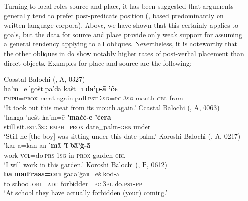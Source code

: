 \documentclass[output=paper,colorlinks,citecolor=brown,draftmode]{langscibook}
\begin{document}
Turning to local roles source and place, it has been suggested that  arguments generally tend to prefer post-predicate position (\citealt{jing_word_2021}, based predominantly on written-language corpora). Above, we have shown that this certainly applies to goals, but the data for source and place provide only weak support for assuming a general tendency applying to all obliques. Nevertheless, it is noteworthy that the other obliques in  do show notably higher rates of post-verbal placement than direct objects. Examples for place and source are the following:

\ea\label{Balochi:ex:21}
\ea\label{Balochi:ex:21a}
Coastal Balochi (\citealt{nourzaei_balochi_coastal_2021}, A, 0327) \\
\gll ha'm=ē 'gōšt pa'dā kašt=ī \textbf{da'p-ā} \textbf{'če} \\
\textsc{emph}=\textsc{prox} meat again pull.\textsc{pst}.\textsc{3sg}=\textsc{pc}.\textsc{3sg} mouth-\textsc{obl} from \\
\glt `{I}t took out this meat from its mouth again.' 
\ex\label{Balochi:ex:21b}
Coastal Balochi (\citealt{nourzaei_balochi_coastal_2021}, A, 0063)\\
\gll 'hanga 'nešt ha'm=ē \textbf{'mačč-e} \textbf{'čērā} \\
still sit.\textsc{pst}.\textsc{3sg} \textsc{emph}=\textsc{prox} date\_palm-\textsc{gen} under \\
\glt `{S}till he [the boy] was sitting under this date-palm.'
\ex\label{Balochi:ex:21c}
Koroshi Balochi (\citealt{nourzaei_balochi_koroshi_2021}, A, 0217)\\
\gll 'kār a=kan-ān \textbf{'mā} \textbf{'ī} \textbf{bā'ġ-ā} \\
work \textsc{vcl}=do.\textsc{prs}-\textsc{1sg} in \textsc{prox} garden-\textsc{obl} \\
\glt `I will work in this garden.'
\ex\label{Balochi:ex:21d}
Koroshi Balochi (\citealt{nourzaei_balochi_koroshi_2021}, B, 0612)\\
\gll \textbf{ba} \textbf{mad'rasā=om} ġada'ġan=eš kod-a \\
to school.\textsc{obl}=\textsc{add} forbidden=\textsc{pc}.\textsc{3pl} do.\textsc{pst}-\textsc{pp} \\
\glt `{A}t school they have actually forbidden (your) coming.'
\z
\z
\end{document}
